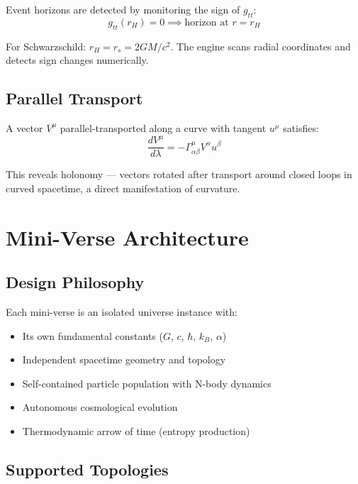\documentclass[12pt, a4paper]{article}
\begin{document}
Event horizons are detected by monitoring the sign of $g_{tt}$:
\begin{equation}
    g_{tt}(r_H) = 0 \implies \text{horizon at } r = r_H
\end{equation}

For Schwarzschild: $r_H = r_s = 2GM/c^2$. The engine scans radial coordinates
and detects sign changes numerically.

\subsection{Parallel Transport}

A vector $V^\mu$ parallel-transported along a curve with tangent $u^\mu$ satisfies:
\begin{equation}
    \frac{dV^\mu}{d\lambda} = -\Gamma^\mu_{\alpha\beta} V^\alpha u^\beta
\end{equation}

This reveals holonomy — vectors rotated after transport around closed loops in
curved spacetime, a direct manifestation of curvature.

\section{Mini-Verse Architecture}
\label{sec:miniverse}

\subsection{Design Philosophy}

Each mini-verse is an isolated universe instance with:
\begin{itemize}
    \item Its own fundamental constants ($G$, $c$, $\hbar$, $k_B$, $\alpha$)
    \item Independent spacetime geometry and topology
    \item Self-contained particle population with N-body dynamics
    \item Autonomous cosmological evolution
    \item Thermodynamic arrow of time (entropy production)
\end{itemize}

\subsection{Supported Topologies}
\end{document}
